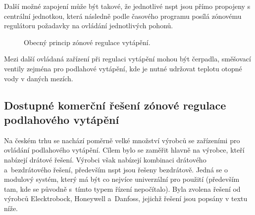 Další možné zapojení může být takové, že jednotlivé \acrshort{nspt} jsou přímo propojeny s centrální jednotkou, která následně podle časového programu posílá zónovému regulátoru požadavky na ovládání jednotlivých pohonů. 


\begin{figure}[H]
    \centering
    \def\svgwidth{0.8\columnwidth}
    
    \caption{Obecný princip zónové regulace vytápění.}
    \label{fig:obecny-princip-zonove-regulace}
\end{figure}

Mezi další ovládaná zařízení při regulaci vytápění mohou být čerpadla, směšovací ventily zejména pro podlahové vytápění, kde je nutné udržovat teplotu otopné vody v daných mezích.

\subsection{Dostupné komerční řešení zónové regulace podlahového vytápění}


Na českém trhu se nachází poměrně velké množství výrobců se zařízeními pro ovládání podlahového vytápění. Cílem bylo se zaměřit hlavně na výrobce, kteří nabízejí drátové řešení. Výrobci však nabízejí kombinaci drátového a~bezdrátového řešení, především \acrshort{nspt} jsou řešeny bezdrátově. Jedná se o modulový systém, který má být co nejvíce univerzální pro použití (především tam, kde se původně s~tímto typem řízení nepočítalo). Byla zvolena řešení od výrobců Elecktrobock, Honeywell a~Danfoss, jejichž řešení jsou popsány v textu níže.



